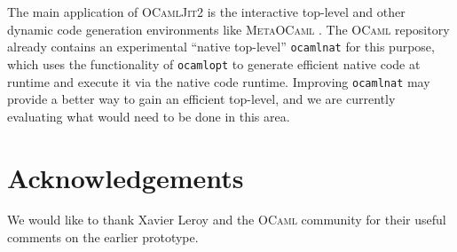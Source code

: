\documentclass[12pt,a4paper,final]{article}
\begin{document}
The main application of \textsc{OCamlJit2} is the interactive top-level and other
dynamic code generation environments like \textsc{MetaOCaml} \cite{Taha06}. The
\textsc{OCaml} repository already contains an experimental ``native top-level''
\texttt{ocamlnat} for this purpose, which uses the functionality of \texttt{ocamlopt}
to generate efficient native code at runtime and execute it via the native code
runtime. Improving \texttt{ocamlnat} may provide a better way to gain an efficient
top-level, and we are currently evaluating what would need to be done in this
area.


\section*{Acknowledgements}

We would like to thank Xavier Leroy and the \textsc{OCaml} community for their
useful comments on the earlier prototype.




\end{document}
